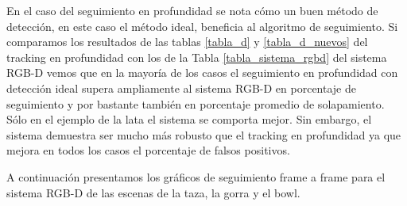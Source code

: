 En el caso del seguimiento en profundidad se nota cómo un buen método de detección, en este caso el método ideal, beneficia al algoritmo de seguimiento. Si comparamos los resultados de las tablas \ref{tabla_d} y \ref{tabla_d_nuevos} del tracking en profundidad con los de la Tabla \ref{tabla_sistema_rgbd} del sistema RGB-D vemos que en la mayoría de los casos el seguimiento en profundidad con detección ideal supera ampliamente al sistema RGB-D en porcentaje de seguimiento y por bastante también en porcentaje promedio de solapamiento. Sólo en el ejemplo de la lata el sistema se comporta mejor. Sin embargo, el sistema demuestra ser mucho más robusto que el tracking en profundidad ya que mejora en todos los casos el porcentaje de falsos positivos.

A continuación presentamos los gráficos de seguimiento frame a frame para el sistema RGB-D de las escenas de la taza, la gorra y el bowl.

